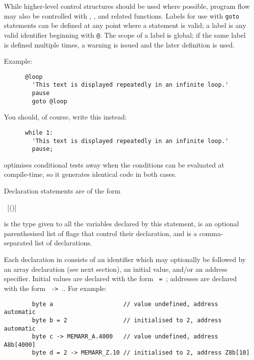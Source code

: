  \label{sec:labels}

    While higher-level control structures should be used where possible, program
    flow may also be controlled with ,
    , and related functions.  Labels for use with
    \lstinline|goto| statements can be defined at any point where a statement is
    valid; a label is any valid identifier beginning with \lstinline|@|. The
    scope of a label is global; if the same label is defined multiple times, a
    warning is issued and the later definition is used.

    Example:
    \begin{lstlisting}
      @loop
        'This text is displayed repeatedly in an infinite loop.'
        pause
        goto @loop
    \end{lstlisting}
    You should, of course, write this instead:
    \begin{lstlisting}
      while 1:
        'This text is displayed repeatedly in an infinite loop.'
        pause;
    \end{lstlisting}
    \compiler{} optimises conditional tests away when the conditions can be
    evaluated at compile-time, so it generates identical code in both cases.



      Declaration statements are of the form

      \noindent{}~[()]~

      \noindent{} is the type given to all the variables declared
      by this statement,  is an optional parenthesised list
      of flags that control their declaration, and  is a
      comma-separated list of declarations.

      Each declaration in  consists of an identifier which
      may optionally be followed by an array declaration (see next section), an
      initial value, and/or an address specifier.  Initial values are declared
      with the form \lstinline| = |; addresses
      are declared with the form
      \lstinline| -> |..  For
      example:
      \begin{lstlisting}
        byte a                    // value undefined, address automatic
        byte b = 2                // initialised to 2, address automatic
        byte c -> MEMARR_A.4000   // value undefined, address A8b[4000]
        byte d = 2 -> MEMARR_Z.10 // initialised to 2, address Z8b[10]
      \end{lstlisting}

